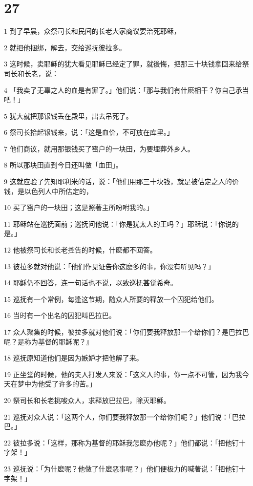 \chapter{27}

\par 1 到了早晨，众祭司长和民间的长老大家商议要治死耶稣，
\par 2 就把他捆绑，解去，交给巡抚彼拉多。
\par 3 这时候，卖耶稣的犹大看见耶稣已经定了罪，就後悔，把那三十块钱拿回来给祭司长和长老，说：
\par 4 「我卖了无辜之人的血是有罪了。」他们说：「那与我们有什麽相干？你自己承当吧！」
\par 5 犹大就把那银钱丢在殿里，出去吊死了。
\par 6 祭司长拾起银钱来，说：「这是血价，不可放在库里。」
\par 7 他们商议，就用那银钱买了窑户的一块田，为要埋葬外乡人。
\par 8 所以那块田直到今日还叫做「血田」。
\par 9 这就应验了先知耶利米的话，说：「他们用那三十块钱，就是被估定之人的价钱，是以色列人中所估定的，
\par 10 买了窑户的一块田；这是照著主所吩咐我的。」
\par 11 耶稣站在巡抚面前；巡抚问他说：「你是犹太人的王吗？」耶稣说：「你说的是。」
\par 12 他被祭司长和长老控告的时候，什麽都不回答。
\par 13 彼拉多就对他说：「他们作见证告你这麽多的事，你没有听见吗？」
\par 14 耶稣仍不回答，连一句话也不说，以致巡抚甚觉希奇。
\par 15 巡抚有一个常例，每逢这节期，随众人所要的释放一个囚犯给他们。
\par 16 当时有一个出名的囚犯叫巴拉巴。
\par 17 众人聚集的时候，彼拉多就对他们说：「你们要我释放那一个给你们？是巴拉巴呢？是称为基督的耶稣呢？』
\par 18 巡抚原知道他们是因为嫉妒才把他解了来。
\par 19 正坐堂的时候，他的夫人打发人来说：「这义人的事，你一点不可管，因为我今天在梦中为他受了许多的苦。」
\par 20 祭司长和长老挑唆众人，求释放巴拉巴，除灭耶稣。
\par 21 巡抚对众人说：「这两个人，你们要我释放那一个给你们呢？」他们说：「巴拉巴。」
\par 22 彼拉多说：「这样，那称为基督的耶稣我怎麽办他呢？」他们都说：「把他钉十字架！」
\par 23 巡抚说：「为什麽呢？他做了什麽恶事呢？」他们便极力的喊著说：「把他钉十字架！」
